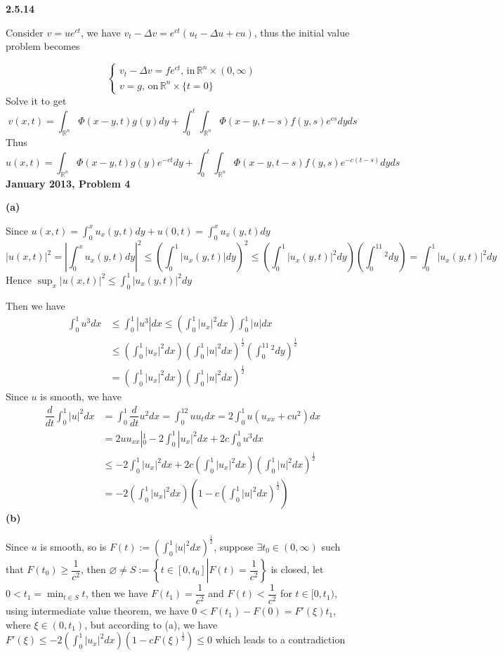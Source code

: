 \documentclass[12pt]{article}
\begin{document}
\textbf{2.5.14} \par
Consider $v=ue^{ct}$, we have $v_{t}-\Delta v=e^{ct}\left(u_{t}-\Delta u+cu\right)$, thus the initial value problem becomes \par
\[
\left\{\begin{matrix}
v_{t}-\Delta v=fe^{ct},\,\text{in}\,\mathbb{R}^{n}\times(0,\infty)\\ 
v=g,\,\text{on}\,\mathbb{R}^{n}\times\{t=0\}
\end{matrix}\right.
\]
Solve it to get
\[
v(x,t)=\int_{\mathbb{R}^n}\Phi(x-y,t)g(y)dy + \int_0^t\int_{\mathbb{R}^n}\Phi(x-y,t-s)f(y,s)e^{cs}dyds
\]
Thus
\[
u(x,t)=\int_{\mathbb{R}^n}\Phi(x-y,t)g(y)e^{-ct}dy + \int_0^t\int_{\mathbb{R}^n}\Phi(x-y,t-s)f(y,s)e^{-c(t-s)}dyds
\]
\textbf{January 2013, Problem 4} \par
\textbf{(a)} \par
Since $\displaystyle u(x,t)=\int_0^xu_x(y,t)dy+u(0,t)=\int_0^xu_x(y,t)dy$
$$\displaystyle |u(x,t)|^2=\left|\int_0^xu_x(y,t)dy\right|^2\leq\left(\int_0^1|u_x(y,t)|dy\right)^2\leq \left(\int_0^1|u_x(y,t)|^2dy\right)\left(\int_0^11^2dy\right)=\int_0^1|u_x(y,t)|^2dy$$
Hence $\displaystyle\sup_x|u(x,t)|^2\leq\int_0^1|u_x(y,t)|^2dy$ \par
Then we have
\[
\begin{aligned}
\int_0^1u^3dx&\leq\int_0^1|u^3|dx\leq \left(\int_0^1|u_x|^2dx\right)\int_0^1|u|dx \\
&\leq \left(\int_0^1|u_x|^2dx\right)\left(\int_0^1|u|^2dx\right)^\frac{1}{2}\left(\int_0^11^2dy\right)^\frac{1}{2} \\
&=\left(\int_0^1|u_x|^2dx\right)\left(\int_0^1|u|^2dx\right)^\frac{1}{2}
\end{aligned}
\]
Since $u$ is smooth, we have
\[
\begin{aligned}
\dfrac{d}{dt}\int_0^1|u|^2dx&=\int_0^1\dfrac{d}{dt}u^2dx=\int_0^12uu_tdx=2\int_0^1u(u_{xx}+cu^2)dx \\
&=2uu_{xx}|_0^1-2\int_0^1|u_x|^2dx+2c\int_0^1u^3dx \\
&\leq -2\int_0^1|u_x|^2dx+2c\left(\int_0^1|u_x|^2dx\right)\left(\int_0^1|u|^2dx\right)^\frac{1}{2} \\
&=-2\left(\int_0^1|u_x|^2dx\right)\left(1-c\left(\int_0^1|u|^2dx\right)^\frac{1}{2}\right)
\end{aligned}
\]
\textbf{(b)} \par
Since $u$ is smooth, so is $F(t):=\displaystyle\left(\int_0^1|u|^2dx\right)^\frac{1}{2}$, suppose $\exists t_0\in (0,\infty)$ such that $F(t_0)\geq \dfrac{1}{c^2}$, then $\varnothing\neq S:=\left\{t\in[0,t_0]\left|\right.F(t)=\dfrac{1}{c^2}\right\}$ is closed, let $0<t_1=\min_{t\in S}t$, then we have $F(t_1)=\dfrac{1}{c^2}$ and $F(t)<\dfrac{1}{c^2}$ for $t\in[0,t_1)$, using intermediate value theorem, we have $0<F(t_1)-F(0)=F'(\xi)t_1$, where $\xi\in(0,t_1)$, but according to (a), we have $\displaystyle F'(\xi)\leq -2\left(\int_0^1|u_x|^2dx\right)\left(1-cF(\xi)^\frac{1}{2}\right)\leq0$ which leads to a contradiction \par
\end{document}
